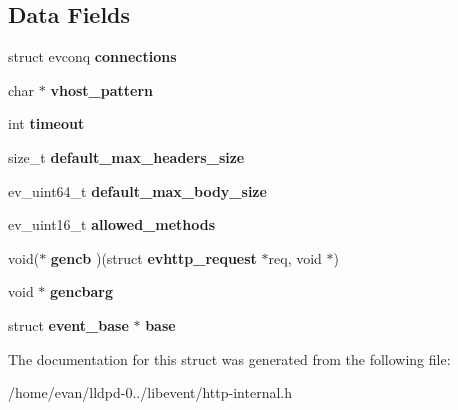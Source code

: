 \subsection*{\-Data \-Fields}
\begin{DoxyCompactItemize}
\item 
struct evconq {\bfseries connections}\label{structevhttp_abbb65a1d20c79df1e0d3647099ed6b95}

\item 
char $\ast$ {\bfseries vhost\-\_\-pattern}\label{structevhttp_af00a8f9d16a8b501f44e08bf02ceae57}

\item 
int {\bfseries timeout}\label{structevhttp_a493b57f443cc38b3d3df9c1e584d9d82}

\item 
size\-\_\-t {\bfseries default\-\_\-max\-\_\-headers\-\_\-size}\label{structevhttp_a6c7c0e11307b5680ed73c7e823c08a71}

\item 
ev\-\_\-uint64\-\_\-t {\bfseries default\-\_\-max\-\_\-body\-\_\-size}\label{structevhttp_a3e7d1e2db48964d27c47d58a439cdb68}

\item 
ev\-\_\-uint16\-\_\-t {\bfseries allowed\-\_\-methods}\label{structevhttp_a6e2fb8b47a0034d3949ae1f6572357a0}

\item 
void($\ast$ {\bfseries gencb} )(struct {\bf evhttp\-\_\-request} $\ast$req, void $\ast$)\label{structevhttp_adc476cb642a10343be1967468a5ca254}

\item 
void $\ast$ {\bfseries gencbarg}\label{structevhttp_addfa13a7b61ca72567983a40828e5b10}

\item 
struct {\bf event\-\_\-base} $\ast$ {\bfseries base}\label{structevhttp_ab1a154f7530a81e9dd1d63fc6b98a5c7}

\end{DoxyCompactItemize}


\-The documentation for this struct was generated from the following file\-:\begin{DoxyCompactItemize}
\item 
/home/evan/lldpd-\/0../libevent/http-\/internal.\-h\end{DoxyCompactItemize}
